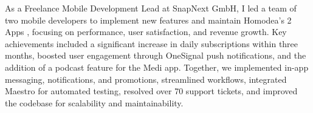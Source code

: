 \documentclass[10pt,a4paper]{altacv}
\begin{document}
\begin{itemize}



As a Freelance Mobile Development Lead at SnapNext GmbH, I led a team of two mobile developers to implement new features and maintain Homodea's 2 Apps , focusing on performance, user satisfaction, and revenue growth. Key achievements included a significant increase in daily subscriptions within three months, boosted user engagement through OneSignal push notifications, and the addition of a podcast feature for the Medi app. Together, we implemented in-app messaging, notifications, and promotions, streamlined workflows, integrated Maestro for automated testing, resolved over 70 support tickets, and improved the codebase for scalability and maintainability.
\newline
\newline





\newline
\end{itemize}
\end{document}
